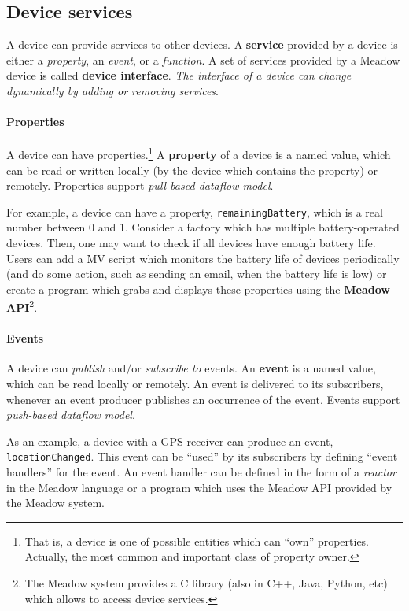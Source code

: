 \documentclass{note}
\begin{document}
\subsection{Device services}
A device can provide services to other devices. 
A \textcolor{blue2}{\bf{}service} provided by a device is either a
{\em property}, an {\em event\/}, or a {\em function\/}. 
A set of services provided by a Meadow device is called
\textcolor{blue2}{\bf{}device interface}. 
\textcolor{blue2}{\em The interface of a device can change
dynamically by adding or removing services\/}.

\paragraph{Properties}
A device can have properties.\footnote{\textcolor{green2}{That is, a device is
    one of possible entities which can ``own'' properties. Actually, the most
    common and important class of property owner.}} A
  \textcolor{blue2}{\bf{}property} 
of a device is a named value, which can be read or written
locally (by the device which contains the property) or remotely.
Properties support {\em pull-based dataflow model\/}.

For example, a device can have a property,
\textcolor{red2}{\texttt{remainingBattery}}, which is a real number
between 0 and 1. Consider a factory which has multiple battery-operated
devices. Then, one may want to check if all devices have enough battery life. 
Users can add a MV script which monitors the battery life of devices
periodically (and do some action, such as sending an email, when the
battery life is low)  
or create a program which grabs and displays these properties
using the \textcolor{blue2}{\bf{}Meadow API}\footnote{\textcolor{green2}{The
    Meadow system provides a C library (also in C++, Java, Python, etc) which
    allows to access device services.}}.


\paragraph{Events}
A device can {\em publish\/} and/or {\em subscribe to\/} events.
An \textcolor{blue2}{\bf{}event} is a named value, 
which can be read locally or remotely. 
An event is delivered to its subscribers, whenever
an event producer publishes an occurrence of the event.
Events support {\em push-based dataflow model\/}.

As an example, a device with a GPS receiver can produce an event,
\textcolor{red2}{\texttt{locationChanged}}. 
This event can be ``used'' by its subscribers by defining ``event handlers''
for the event. An event handler can be defined in the form of a {\em
  reactor\/} in the Meadow language or a program which uses the Meadow API
provided by the Meadow system.
\end{document}
